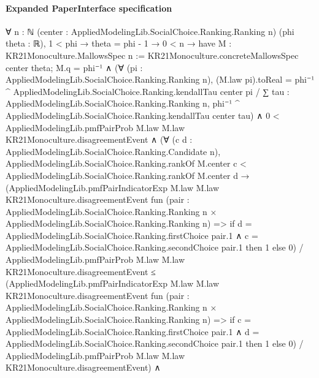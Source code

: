 \documentclass[10pt]{article}
\begin{document}
\paragraph{Expanded PaperInterface specification}
\begin{ReviewVerbatim}
∀ {n : ℕ} (center : AppliedModelingLib.SocialChoice.Ranking.Ranking n) (phi theta : ℝ),
  1 < phi →
    theta = phi - 1 →
      0 < n →
        have M : KR21Monoculture.MallowsSpec n := KR21Monoculture.concreteMallowsSpec center theta;
        M.q = phi⁻¹ ∧
          (∀ (pi : AppliedModelingLib.SocialChoice.Ranking.Ranking n),
              (M.law pi).toReal =
                phi⁻¹ ^ AppliedModelingLib.SocialChoice.Ranking.kendallTau center pi /
                  ∑ tau : AppliedModelingLib.SocialChoice.Ranking.Ranking n,
                    phi⁻¹ ^ AppliedModelingLib.SocialChoice.Ranking.kendallTau center tau) ∧
            0 < AppliedModelingLib.pmfPairProb M.law M.law KR21Monoculture.disagreementEvent ∧
              (∀ (c d : AppliedModelingLib.SocialChoice.Ranking.Candidate n),
                  AppliedModelingLib.SocialChoice.Ranking.rankOf M.center c <
                      AppliedModelingLib.SocialChoice.Ranking.rankOf M.center d →
                    (AppliedModelingLib.pmfPairIndicatorExp M.law M.law KR21Monoculture.disagreementEvent
                          fun
                            (pair :
                              AppliedModelingLib.SocialChoice.Ranking.Ranking n ×
                                AppliedModelingLib.SocialChoice.Ranking.Ranking n) =>
                          if
                              d = AppliedModelingLib.SocialChoice.Ranking.firstChoice pair.1 ∧
                                c = AppliedModelingLib.SocialChoice.Ranking.secondChoice pair.1 then
                            1
                          else 0) /
                        AppliedModelingLib.pmfPairProb M.law M.law KR21Monoculture.disagreementEvent ≤
                      (AppliedModelingLib.pmfPairIndicatorExp M.law M.law KR21Monoculture.disagreementEvent
                          fun
                            (pair :
                              AppliedModelingLib.SocialChoice.Ranking.Ranking n ×
                                AppliedModelingLib.SocialChoice.Ranking.Ranking n) =>
                          if
                              c = AppliedModelingLib.SocialChoice.Ranking.firstChoice pair.1 ∧
                                d = AppliedModelingLib.SocialChoice.Ranking.secondChoice pair.1 then
                            1
                          else 0) /
                        AppliedModelingLib.pmfPairProb M.law M.law KR21Monoculture.disagreementEvent) ∧

\end{ReviewVerbatim}
\end{document}
